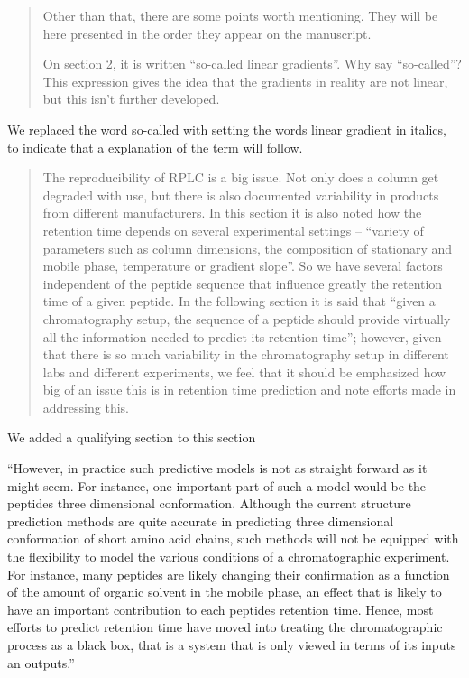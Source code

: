 \documentclass[letterpaper]{article}
\newcommand{\breview}{\begin{quotation}\begin{bf}\noindent}
\newcommand{\ereview}{\end{bf}\end{quotation}}
\begin{document}
\breview


Other than that, there are some points worth mentioning. They will be here presented in the order they appear on the manuscript.

On section 2, it is written ``so-called linear gradients''. Why say ``so-called''? This expression gives the idea that the gradients in reality are not linear, but this isn’t further developed.

\ereview
We replaced the word so-called with setting the words linear gradient in italics, to indicate that a explanation of the term will follow. 
\breview

The reproducibility of RPLC is a big issue. Not only does a column get degraded with use, but there is also documented variability in products from different manufacturers. In this section it is also noted how the retention time depends on several experimental settings – ``variety of parameters such as column dimensions, the composition of stationary and mobile phase, temperature or gradient slope''. So we have several factors independent of the peptide sequence that influence greatly the retention time of a given peptide. In the following section it is said that ``given a chromatography setup, the 
sequence of a peptide should provide virtually all the information needed to predict its retention time''; however, given that there is so much variability in the chromatography setup in different labs and different experiments, we feel that it should be emphasized how big of an issue this is in retention time prediction and note efforts made in addressing this.

\ereview
We added a qualifying section to this section

``However, in practice such predictive models is not as straight
forward as it might seem. For instance, one important part of such a
model would be the peptides three dimensional conformation. Although
the current structure prediction methods are quite accurate in
predicting three dimensional conformation of short amino acid chains,
such methods will not be equipped with the flexibility to model the
various conditions of a chromatographic experiment. For instance, many
peptides are likely changing their confirmation as a function of the
amount of organic solvent in the mobile phase, an effect that is
likely to have an important contribution to each peptides retention
time. Hence, most efforts to predict retention time have moved into
treating the chromatographic process as a black box, that is a system
that is only viewed in terms of its inputs an outputs.''
\end{document}
